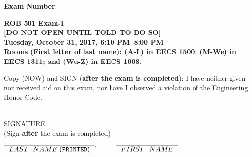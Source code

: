 \documentclass[letterpaper]{article}
\newcommand{\bline}[1]{\underline{\hspace*{#1}}}
\begin{document}


\begin{flushright}
{\bf Exam Number:}\bline{0.6in}
\end{flushright}

\vspace*{.1in}
\begin{center}
\LARGE \bf
ROB 501 Exam-I \\
\textbf{[DO NOT OPEN UNTIL TOLD TO DO SO]}\\
\large
Tuesday, October 31, 2017, 6:10 PM--8:00 PM \\
Rooms (First letter of last name): (A-L) in EECS 1500; (M-We) in EECS 1311; and (Wu-Z) in EECS 1008.
\end{center}

\vspace*{0.3in}

 Copy (NOW) and SIGN ({\bf after the exam is completed}): I have neither given nor received aid on this exam, nor have I observed a violation of the
Engineering Honor Code.

\vspace*{1in}
\begin{flushright}
\underline{\hspace*{1.in}} \\
SIGNATURE \\
(Sign {\bf after} the exam is completed)
\end{flushright}

\vspace*{1in}

\begin{center}
$\overline{\mathrm ~~LAST~~NAME~ ({\tt PRINTED})~~}^, \hspace*{.4in} \overline{\mathrm ~~FIRST~~NAME~~}$ \\

\vspace*{2cm}

 \\

\end{center}
\end{document}
